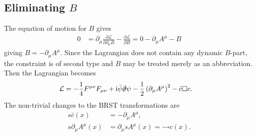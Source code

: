 \documentclass[english, parskip=full]{scrartcl}
\newcommand{\kla}{}
\renewcommand{\i}{\text{i}}
\begin{document}
\subsection{Eliminating $B$}
The equation of motion for $B$ gives
\begin{align}
0 &= \partial_\mu \frac{\partial \mathcal{L}}{\partial \partial_\mu B} - \frac{\partial \mathcal{L}}{\partial B} = 0 - \partial_\mu A^\mu - B
\end{align}
giving $B = -\partial_\mu A^\mu$.
Since the Lagrangian does not contain any dynamic $B$-part, the constraint is of second type and $B$ may be treated merely as an abbreviation.
Then the Lagrangian becomes
\begin{align}
\mathcal{L} &= -\frac{1}{4} F^{\mu\nu} F_{\mu\nu} + \i \bar{\psi} \slashed{\partial}  \psi - \frac{1}{2} \kla\left( \partial_\mu A^\mu  \right)^2 - \bar{c} \square c.
\end{align}
The non-trivial changes to the BRST transformations are
\begin{align}
s\bar{c}(x) &= - \partial_\mu A^\mu,\\
s\partial_\mu A^\mu(x) &= \partial_\mu sA^\mu(x) = -\square c(x).
\end{align}
\end{document}
